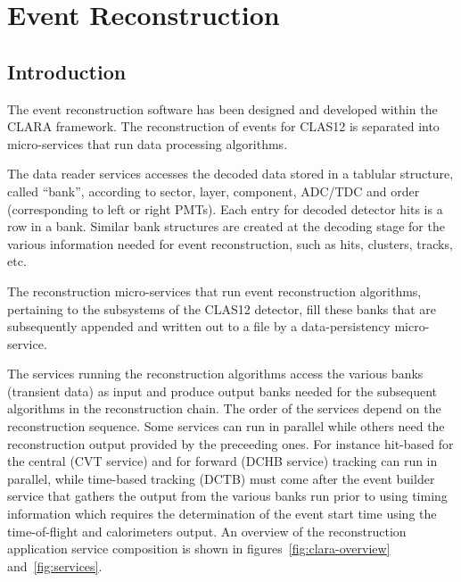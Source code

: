 \documentclass[3p,times,twocolumn]{elsarticle}
\begin{document}
\section{Event Reconstruction}
\subsection{Introduction}

The event reconstruction software has been designed and developed within the CLARA framework.
The reconstruction of events for CLAS12 is separated into micro-services that run data processing algorithms.

The data reader services accesses the decoded data stored in a tablular structure,
called ``bank'', according to
sector, layer, component, ADC/TDC and order (corresponding to left or right PMTs). Each entry for decoded
detector hits is a row in a bank.  Similar bank structures are created at the decoding stage for the
various information needed for event reconstruction, such as hits, clusters, tracks, etc.

The reconstruction micro-services that run event reconstruction algorithms, pertaining to
the subsystems of the CLAS12 detector, fill these banks
that are subsequently appended and written out to a file by a data-persistency micro-service.

The services running the reconstruction algorithms access the various banks (transient data) as input
and produce output banks needed for the subsequent algorithms in the reconstruction chain.
The order of the services depend on the reconstruction sequence.  Some services can run in parallel while others
need the reconstruction output provided by the preceeding ones.
For instance hit-based for the central (CVT service) and for forward (DCHB service) tracking
can run in parallel, while time-based tracking (DCTB) must come after the event builder service
that gathers the output from the various banks run prior to using timing information which requires
the determination of the event start time using the time-of-flight and calorimeters output.
An  overview of the reconstruction application service composition is shown in figures~\ref{fig:clara-overview} and~\ref{fig:services}.


\end{document}
